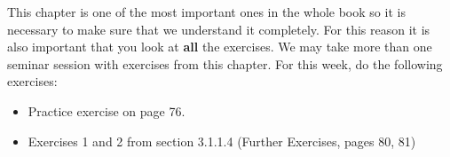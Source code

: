 This chapter is one of the most important ones in the whole book so it is necessary to make sure that we understand it completely.  For this reason it is also important that you look at \textbf{all} the exercises.  We may take more than one seminar session with exercises from this chapter.  For this week, do the following exercises:

\begin{itemize}
\item Practice exercise on page 76.
\item Exercises 1 and 2 from section 3.1.1.4 (Further Exercises, pages 80, 81)
\end{itemize}



